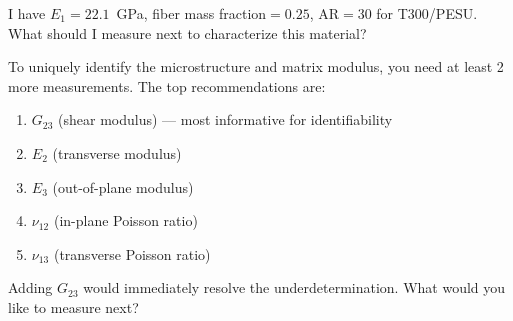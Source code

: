 \documentclass[preprint,review,10pt,number]{elsarticle}
\begin{document}

\begin{center}
\begin{tcolorbox}[
    breakable,
    colback=gray!5,
    colframe=black,
    boxrule=0.6pt,
    arc=2pt,
    left=8pt, right=8pt, top=6pt, bottom=6pt,
    title={\textbf{Identifiability Demo} \hfill \textit{Progressive measurement, conditional parameter promotion}},
    fonttitle=\small
]

\begin{tcolorbox}[
    breakable,
    colback=gray!8, colframe=gray!60, boxrule=0.5pt, arc=2pt,
    left=6pt, right=6pt, top=4pt, bottom=4pt,
    title={\textbf{User}}, fonttitle=\small\bfseries, coltitle=black
]
\small
I have $E_1=22.1$~GPa, fiber mass fraction$=0.25$, AR$=30$ for T300/PESU. What should I measure next to characterize this material?
\end{tcolorbox}
\vspace{4pt}
\begin{tcolorbox}[
    breakable,
    colback=gray!3, colframe=gray!40, boxrule=0.5pt, arc=2pt,
    left=6pt, right=6pt, top=4pt, bottom=4pt,
    title={\textbf{\texttt{MateriAl}} \hfill \texttt{\footnotesize\textcolor{gray!70!black}{\ding{110}\ check\_identifiability}}},
    fonttitle=\small\bfseries, coltitle=black
]
\small
To uniquely identify the microstructure and matrix modulus, you need at least 2 more measurements. The top recommendations are:
\begin{enumerate}[leftmargin=1.4em, itemsep=1pt, topsep=2pt]
\item $G_{23}$ (shear modulus) --- most informative for identifiability
\item $E_2$ (transverse modulus)
\item $E_3$ (out-of-plane modulus)
\item $\nu_{12}$ (in-plane Poisson ratio)
\item $\nu_{13}$ (transverse Poisson ratio)
\end{enumerate}
Adding $G_{23}$ would immediately resolve the underdetermination. What would you like to measure next?
\end{tcolorbox}


\end{tcolorbox}
\end{center}
\end{document}
